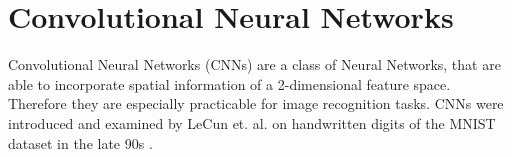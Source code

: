 
\section{Convolutional Neural Networks}\label{sec:prev_cnn}
Convolutional Neural Networks (CNNs) are a class of Neural Networks, that are able to incorporate spatial information of a 2-dimensional feature space. Therefore they are especially practicable for image recognition tasks. 
CNNs were introduced and examined by LeCun et. al. on handwritten digits of the MNIST dataset in the late 90s
\cite{LeCun1998}.
